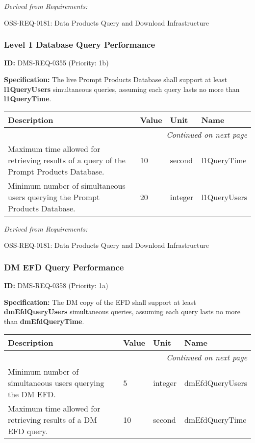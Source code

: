 \documentclass[SE,toc,lsstdraft]{lsstdoc}
\makeatletter
\newcommand{\paramname}[1]{\hspace{0pt}#1}
\newcommand{\unitname}[1]{\hspace{0pt}#1}
\newenvironment{parameters}[0]{%
\setlength\LTleft{0pt}
\setlength\LTright{\fill}
\begin{small}
\begin{longtable}[]{|p{0.49\textwidth}|l|p{0.6in}|p{1.70in}@{}|}

\hline \textbf{Description} & \textbf{Value} & \textbf{Unit} & \textbf{Name} \\ \hline
\endhead

\hline \multicolumn{4}{r}{\emph{Continued on next page}} \\
\endfoot

\hline\hline
\endlastfoot
}{%
\hline
\end{longtable}
\end{small}
}
\makeatother
\begin{document}
\emph{Derived from Requirements:}

OSS-REQ-0181:
Data Products Query and Download Infrastructure \newline

\subsubsection{Level 1 Database Query Performance}

\label{DMS-REQ-0355}
\textbf{ID:} DMS-REQ-0355 (Priority: 1b)

\textbf{Specification:}
The live Prompt Products Database shall support at least \textbf{l1QueryUsers} simultaneous queries, assuming each query lasts no more than \textbf{l1QueryTime}.

\begin{parameters}
Maximum time allowed for retrieving results of a query of the Prompt Products Database.
&
10
&
\unitname{%
second
}
&
\paramname{%
l1QueryTime
} \\\hline
Minimum number of simultaneous users querying the Prompt Products Database.
&
20
&
\unitname{%
integer
}
&
\paramname{%
l1QueryUsers
} \\\hline
\end{parameters}

\emph{Derived from Requirements:}

OSS-REQ-0181:
Data Products Query and Download Infrastructure \newline

\subsubsection{DM EFD Query Performance}

\label{DMS-REQ-0358}
\textbf{ID:} DMS-REQ-0358 (Priority: 1a)

\textbf{Specification:}
The DM copy of the EFD shall support at least \textbf{dmEfdQueryUsers} simultaneous queries, assuming each query lasts no more than \textbf{dmEfdQueryTime}.

\begin{parameters}
Minimum number of simultaneous users querying the DM EFD.
&
5
&
\unitname{%
integer
}
&
\paramname{%
dmEfdQueryUsers
} \\\hline
Maximum time allowed for retrieving results of a DM EFD query.
&
10
&
\unitname{%
second
}
&
\paramname{%
dmEfdQueryTime
} \\\hline
\end{parameters}
\end{document}
